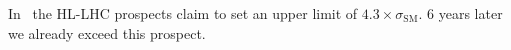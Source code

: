 In~\cite{ATL-PHYS-PUB-2015-046} the HL-LHC prospects claim to set an
upper limit of $4.3 \times \sigma_\text{SM}$. 6 years later we already
exceed this prospect.



